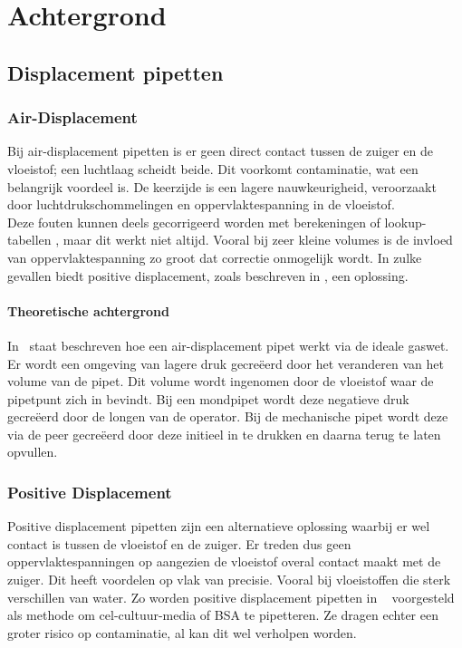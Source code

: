\chapter{Achtergrond}


\section{Displacement pipetten}
\subsection{Air-Displacement}
Bij air-displacement pipetten is er geen direct contact tussen de zuiger en de vloeistof; een luchtlaag scheidt beide. Dit voorkomt contaminatie, wat een belangrijk voordeel is. De keerzijde is een lagere nauwkeurigheid, veroorzaakt door luchtdrukschommelingen en oppervlaktespanning in de vloeistof.
\\[12pt]Deze fouten kunnen deels gecorrigeerd worden met berekeningen \cite{RN15} of lookup-tabellen \cite{RN35}, maar dit werkt niet altijd. Vooral bij zeer kleine volumes is de invloed van oppervlaktespanning zo groot dat correctie onmogelijk wordt. In zulke gevallen biedt positive displacement, zoals beschreven in \cite{RN15}, een oplossing.
\subsubsection{Theoretische achtergrond}
In\ \cite{RN15} staat beschreven hoe een air-displacement pipet werkt via de ideale gaswet. Er wordt een omgeving van lagere druk gecreëerd door het veranderen van het volume van de pipet. Dit volume wordt ingenomen door de vloeistof waar de pipetpunt zich in bevindt. Bij een mondpipet wordt deze negatieve druk gecreëerd door de longen van de operator. Bij de mechanische pipet wordt deze via de peer gecreëerd door deze initieel in te drukken en daarna terug te laten opvullen.
\subsection{Positive Displacement}
Positive displacement pipetten zijn een alternatieve oplossing waarbij er wel contact is tussen de vloeistof en de zuiger. Er treden dus geen oppervlaktespanningen op aangezien de vloeistof overal contact maakt met de zuiger. Dit heeft voordelen op vlak van precisie. Vooral bij vloeistoffen die sterk verschillen van water. Zo worden positive displacement pipetten in \ \cite{RN37} voorgesteld als methode om cel-cultuur-media of BSA te pipetteren. Ze dragen echter een groter risico op contaminatie, al kan dit wel verholpen worden.

